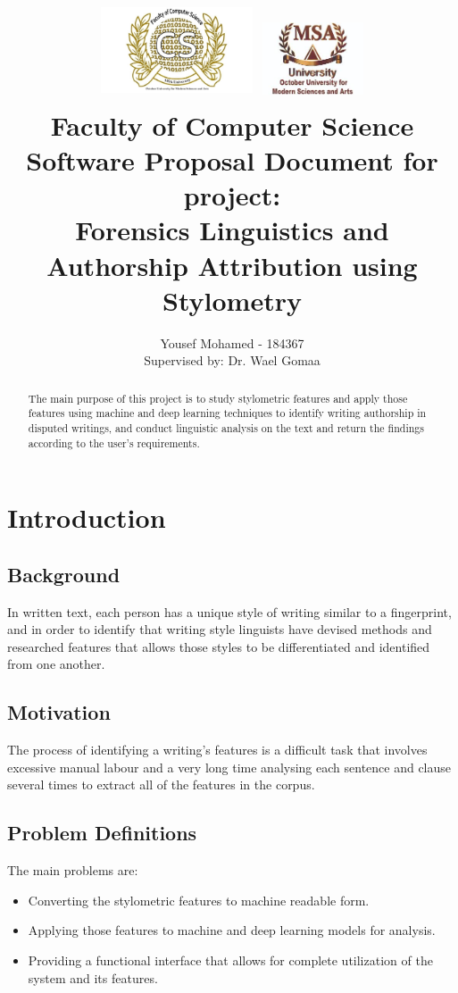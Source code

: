 \documentclass[12pt]{article}
\title{
{\includegraphics[width=4.5cm, height=3cm]{Images/CSLogo.jpg}
    \includegraphics[width=3cm, height=2.5cm]{Images/MSALogo.jpg}}\\
{\large Faculty of Computer Science}\\
{Software Proposal Document for project: \\ Forensics Linguistics and Authorship Attribution using Stylometry}
}
\date{}
\author{Yousef Mohamed - 184367 \\ Supervised by: Dr. Wael Gomaa}
\begin{document}
\maketitle

\begin{abstract}
    The main purpose of this project is to study stylometric features and apply those features using machine and deep learning techniques to identify writing authorship in disputed writings, and conduct linguistic analysis on the text and return the findings according to the user's requirements.
\end{abstract}

\section{Introduction}
\subsection{Background}
In written text, each person has a unique style of writing similar to a fingerprint, and in order to identify that writing style linguists have devised methods and researched features that allows those styles to be differentiated and identified from one another.

\subsection{Motivation}
The process of identifying a writing's features is a difficult task that involves excessive manual labour and a very long time analysing each sentence and clause several times to extract all of the features in the corpus.

\subsection{Problem Definitions}
The main problems are:
\begin{itemize}
    \item Converting the stylometric features to machine readable form.
    \item Applying those features to machine and deep learning models for analysis.
    \item Providing a functional interface that allows for complete utilization of the system and its features.
\end{itemize}
\end{document}
